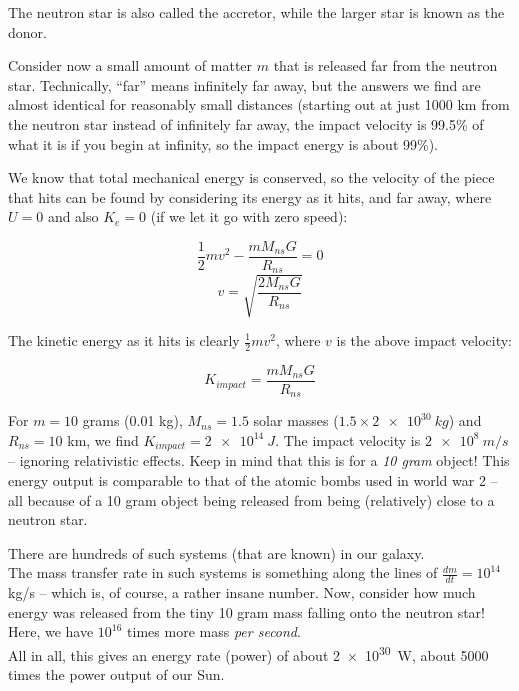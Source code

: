 The neutron star is also called the accretor, while the larger star is known as the donor.

Consider now a small amount of matter $m$ that is released far from the neutron star. Technically, ``far'' means infinitely far away, but the answers we find are almost identical for reasonably small distances (starting out at just 1000 km from the neutron star instead of infinitely far away, the impact velocity is 99.5\% of what it is if you begin at infinity, so the impact energy is about 99\%).

We know that total mechanical energy is conserved, so the velocity of the piece that hits can be found by considering its energy as it hits, and far away, where $U = 0$ and also $K_e = 0$ (if we let it go with zero speed):

\begin{equation}
\frac{1}{2} m v^2 - \frac{m M_{ns} G}{R_{ns}} = 0
\end{equation}
\begin{equation}
v = \sqrt{\frac{2 M_{ns} G}{R_{ns}}}
\end{equation}

The kinetic energy as it hits is clearly $\displaystyle \frac{1}{2} m v^2$, where $v$ is the above impact velocity:

\begin{equation}
K_{impact} = \frac{m M_{ns} G}{R_{ns}}
\end{equation}

For $m = 10$ grams (0.01 kg), $M_{ns} = 1.5$ solar masses ($1.5 \times \SI{2e30}{kg}$) and $R_{ns} = 10$ km, we find $K_{impact} = \SI{2e14}{J}$. The impact velocity is $\SI{2e8}{m/s}$ -- ignoring relativistic effects. Keep in mind that this is for a \emph{10 gram} object! This energy output is comparable to that of the atomic bombs used in world war 2 -- all because of a 10 gram object being released from being (relatively) close to a neutron star.

There are hundreds of such systems (that are known) in our galaxy.\\
The mass transfer rate in such systems is something along the lines of $\displaystyle \frac{dm}{dt} = 10^{14}$ kg/s -- which is, of course, a rather insane number. Now, consider how much energy was released from the tiny 10 gram mass falling onto the neutron star! Here, we have $10^{16}$ times more mass \emph{per second}.\\
All in all, this gives an energy rate (power) of about \SI{2e30}{W}, about 5000 times the power output of our Sun.

